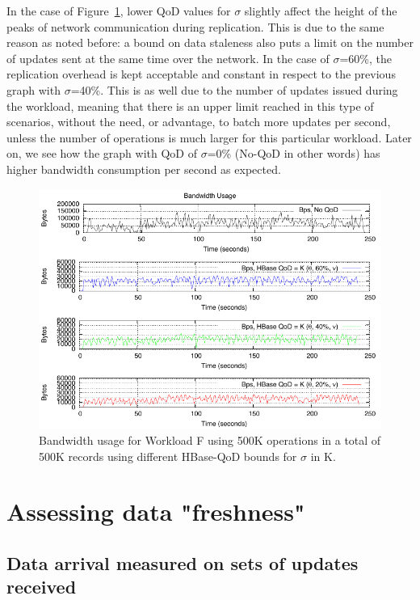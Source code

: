In the case of Figure~\ref{fig-bandwidth-worloadf-10threads}, lower QoD values for $\sigma$ slightly affect the height of the peaks of network communication during replication. This is due to the same reason as noted before: a bound on data staleness also puts a limit on the number of updates sent at the same time over the network. In the case of $\sigma$=60\%, the replication overhead is kept acceptable and constant in respect to the previous graph with $\sigma$=40\%. This is as well due to the number of updates issued during the workload, meaning that there is an upper limit reached in this type of scenarios, without the need, or advantage, to batch more updates per second, unless the number of operations is much larger for this particular workload. Later on, we see how the graph with QoD of $\sigma$=0\% (No-QoD in other words) has higher bandwidth consumption per second as expected.

\begin{figure}
\centering
\includegraphics[scale=1.3]{figs/multiplot-size-workloadf-allbounds.pdf}
\caption{Bandwidth usage for Workload F using 500K operations in a total of 500K records using different HBase-QoD bounds for $\sigma$ in K.}
\label{fig-bandwidth-worloadf-10threads}
\end{figure}

\section{Assessing data "freshness"}
\subsection{Data arrival measured on sets of updates received}

